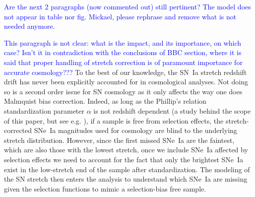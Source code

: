 \documentclass[]{aa} %
\newcommand{\mr}[1]{{\textcolor[rgb]{0.60,0.10,0.6}{#1}}}
\newcommand{\nn}[1]{{\textcolor[rgb]{1, 0.27, 0}{#1}}}
\newcommand{\yc}[1]{{\textcolor{blue}{#1}}}
\begin{document}
\yc{Are the next 2 paragraphs (now commented out) still pertinent? The model does not appear in table nor 
fig. Mickael, please rephrase and remove what is not needed anymore.}



\yc{This paragraph is not clear: what is the impact, and its importance, on which case? Isn't it in contradiction with the conclusions of BBC section, where it is said that proper handling of stretch correction is of paramount importance for accurate cosmology???}
\mr{To the best of our knowledge, the SN~Ia stretch redshift drift has never
    been explicitly accounted for in cosmological analyses. Not doing so is a
    second order issue for SN cosmology as it only affects the way one does
    Malmquist bias correction. Indeed, as long as the Phillip's relation
    standardization parameter $\alpha$ is not redshift dependent (a study behind
    the scope of this paper, but see e.g. \citealt{scolnic2018a}), if a sample
    is free from selection effects, the stretch-corrected SNe~Ia magnitudes used
    for cosmology are blind to the underlying stretch distribution.  However,
    since the first missed SNe~Ia are the faintest, which are also those with
    the lowest stretch, once we include SNe~Ia affected by selection effects we
    need to account for the fact that only the brightest SNe~Ia exist in the
    low-stretch end of the sample after standardization. The modeling of the SN
    stretch then enters the analysis to understand which SNe~Ia are missing
given the selection functions to mimic a selection-bias free sample.}
\end{document}
